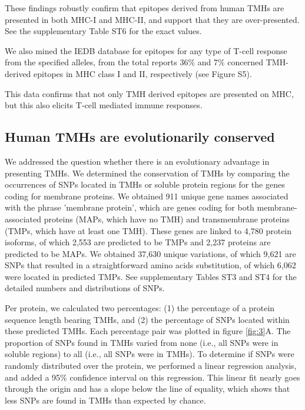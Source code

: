 \documentclass[utf8]{frontiersSCNS} %
\begin{document}
These findings robustly confirm that
epitopes derived from human TMHs are presented in both MHC-I and MHC-II, and support that they are over-presented.
See the supplementary Table ST6 for the exact values.

We also mined the IEDB database for epitopes for
any type of T-cell response from the specified
alleles, from the total reports 36\% and 7\% 
concerned TMH-derived epitopes in MHC class I and II, respectively 
(see Figure S5). 

This data confirms that not only TMH derived epitopes are presented on MHC, 
but this also elicits T-cell mediated immune responses.

\subsection{Human TMHs are evolutionarily conserved}


We addressed the question whether there is an evolutionary advantage in presenting TMHs.
We determined the conservation of TMHs 
by comparing the occurrences of SNPs located in TMHs or soluble protein regions 
for the genes coding for membrane proteins.
We obtained 911 unique gene names associated with the phrase 'membrane protein',
which are genes coding for both membrane-associated proteins (MAPs, which have no TMH) and 
transmembrane proteins (TMPs, which have at least one TMH).
These genes are linked to 4,780 protein isoforms, 
of which 2,553 are predicted to be TMPs and 
2,237 proteins are predicted to be MAPs.
We obtained 37,630 unique variations, 
of which 9,621 are SNPs that resulted in a straightforward amino acids substitution, 
of which 6,062 were located in predicted TMPs.
See supplementary Tables ST3 and ST4 
for the detailed numbers and distributions of SNPs.

Per protein, we calculated two percentages: 
(1) the percentage of a protein sequence length bearing TMHs, 
and (2) the percentage of SNPs located within these predicted TMHs.
Each percentage pair was plotted in figure \ref{fig:3}A.
The proportion of SNPs found in TMHs varied from 
none (i.e., all SNPs were in
soluble regions) to all (i.e., all SNPs were in
TMHs).
To determine if SNPs were randomly distributed over the protein, we performed a linear regression analysis,
and added a 95\% confidence interval on this regression.
This linear fit nearly goes through the origin and has a slope
below the line of equality,
which shows that less SNPs are found in TMHs than expected by chance.
\end{document}
